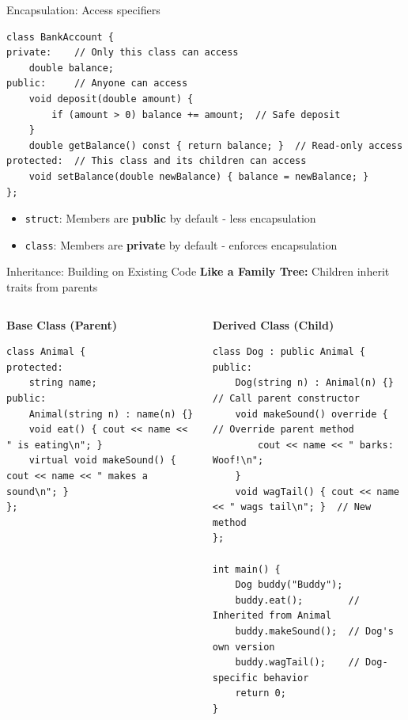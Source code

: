 \begin{frame}[fragile]{Encapsulation: Access specifiers}
	\begin{verbatim}
class BankAccount {
private:    // Only this class can access
    double balance;
public:     // Anyone can access
    void deposit(double amount) {
        if (amount > 0) balance += amount;  // Safe deposit
    }
    double getBalance() const { return balance; }  // Read-only access
protected:  // This class and its children can access
    void setBalance(double newBalance) { balance = newBalance; }
};
    \end{verbatim}
    \begin{itemize}
        \item \texttt{struct}: Members are \textbf{public} by default - less encapsulation
        \item \texttt{class}: Members are \textbf{private} by default - enforces encapsulation
    \end{itemize}
\end{frame}

\begin{frame}[fragile]{Inheritance: Building on Existing Code}
	\textbf{Like a Family Tree:} Children inherit traits from parents

	\begin{columns}
		\begin{column}{0.3\textwidth}
			\textbf{Base Class (Parent)}
			\begin{verbatim}
class Animal {
protected:
    string name;
public:
    Animal(string n) : name(n) {}
    void eat() { cout << name << " is eating\n"; }
    virtual void makeSound() { cout << name << " makes a sound\n"; }
};
    \end{verbatim}
		\end{column}
		\begin{column}{0.7\textwidth}
			\textbf{Derived Class (Child)}
			\begin{verbatim}
class Dog : public Animal {
public:
    Dog(string n) : Animal(n) {}  // Call parent constructor
    void makeSound() override {        // Override parent method
        cout << name << " barks: Woof!\n";
    }
    void wagTail() { cout << name << " wags tail\n"; }  // New method
};

int main() {
    Dog buddy("Buddy");
    buddy.eat();        // Inherited from Animal
    buddy.makeSound();  // Dog's own version
    buddy.wagTail();    // Dog-specific behavior
    return 0;
}
    \end{verbatim}
		\end{column}
	\end{columns}
\end{frame}

